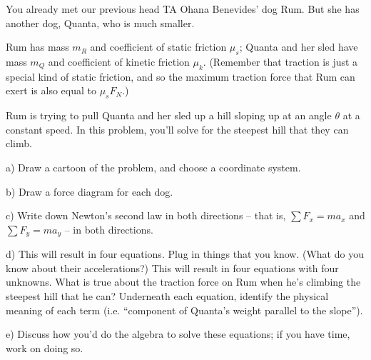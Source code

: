 \documentclass[12pt]{article}
\begin{document}
\newpage

You already met our previous head TA Ohana Benevides' dog Rum. But she has another dog, Quanta, who is much smaller.

Rum has mass $m_R$ and coefficient of static friction $\mu_s$; Quanta and her sled have mass $m_Q$ and coefficient of kinetic friction $\mu_k$. (Remember that traction is just a special kind of static friction, and so the maximum traction force that Rum can exert is also equal to $\mu_s F_N$.)

Rum is trying to pull Quanta and her sled up a hill sloping up at an angle $\theta$ at a constant speed. In this problem, you'll solve for the
steepest hill that they can climb.

a) Draw a cartoon of the problem, and choose a coordinate system. 

\vspace{2in}

b) Draw a force diagram for each dog. 

\vspace{3in}
\newpage
c) Write down Newton's second law in both directions -- that is, $\sum F_x = ma_x$ and $\sum F_y = ma_y$ -- 
in both directions.

\vspace{2in}
d) This will result in four equations. Plug in things that you know. (What do you know about their accelerations?) This will result in four equations with 
four unknowns. What is true about the traction force on Rum when he's climbing the steepest hill that he can?
Underneath each equation, identify the physical meaning of each term (i.e. ``component of Quanta's weight parallel to the slope''). 

\vspace{3.5in}

e) Discuss how you'd do the algebra to solve these equations; if you have time, work on doing so.
\end{document}
